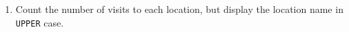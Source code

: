 \documentclass[12pt,a4paper]{article}
\begin{document}
\begin{enumerate}


\item Count the number of visits to each location, but display the location name in \texttt{UPPER} case.





\end{enumerate}
\end{document}
